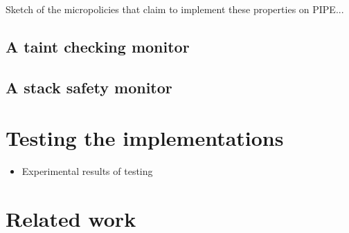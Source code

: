 \documentclass[conference]{IEEEtran}
\begin{document}
Sketch of the micropolicies that claim to implement these properties on
PIPE...

\subsection{A taint checking monitor}

\subsection{A stack safety monitor}

\section{Testing the implementations}

\begin{itemize}
\item Experimental results of testing
\end{itemize}

\section{Related work}
\end{document}
